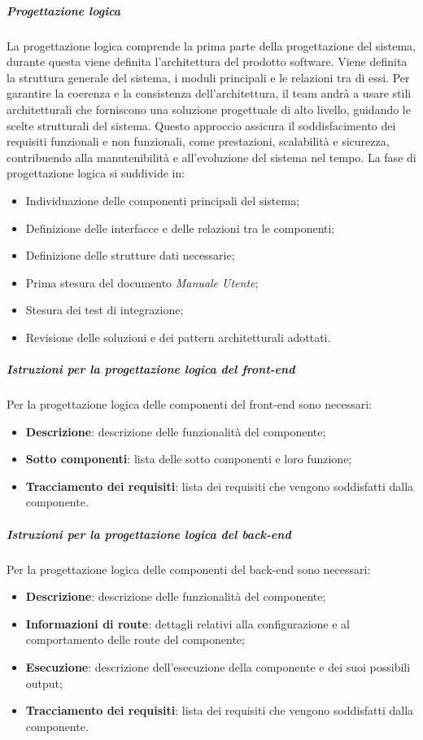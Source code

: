 \subparagraph{Progettazione logica}
\label{subpar:progettazione_logica}
La progettazione logica comprende la prima parte della progettazione del sistema, durante questa viene definita l'architettura del prodotto software.
Viene definita la struttura generale del sistema, i moduli principali e le relazioni tra di essi.
Per garantire la coerenza e la consistenza dell'architettura, il team andrà a usare stili architetturali che forniscono una soluzione progettuale di alto livello, guidando le scelte strutturali del sistema. 
Questo approccio assicura il soddisfacimento dei requisiti funzionali e non funzionali, come prestazioni, scalabilità e sicurezza, contribuendo alla manutenibilità e all'evoluzione del sistema nel tempo.
La fase di progettazione logica si suddivide in:
\begin{itemize}
    \item Individuazione delle componenti principali del sistema;
    \item Definizione delle interfacce e delle relazioni tra le componenti;
    \item Definizione delle strutture dati necessarie;
    \item Prima stesura del documento \textit{Manuale Utente};
    \item Stesura dei test di integrazione;
    \item Revisione delle soluzioni e dei pattern architetturali adottati.
\end{itemize}

\subparagraph{Istruzioni per la progettazione logica del front-end}
Per la progettazione logica delle componenti del front-end sono necessari:
\begin{itemize}
    \item \textbf{Descrizione}: descrizione delle funzionalità del componente;
    \item \textbf{Sotto componenti}: lista delle sotto componenti e loro funzione;
    \item \textbf{Tracciamento dei requisiti}: lista dei requisiti che vengono soddisfatti dalla componente.
\end{itemize}

\subparagraph{Istruzioni per la progettazione logica del back-end}
Per la progettazione logica delle componenti del back-end sono necessari:
\begin{itemize}
    \item \textbf{Descrizione}: descrizione delle funzionalità del componente;
    \item \textbf{Informazioni di route}: dettagli relativi alla configurazione e al comportamento delle route del componente;
    \item \textbf{Esecuzione}: descrizione dell'esecuzione della componente e dei suoi possibili output;
    \item \textbf{Tracciamento dei requisiti}: lista dei requisiti che vengono soddisfatti dalla componente.
\end{itemize}

